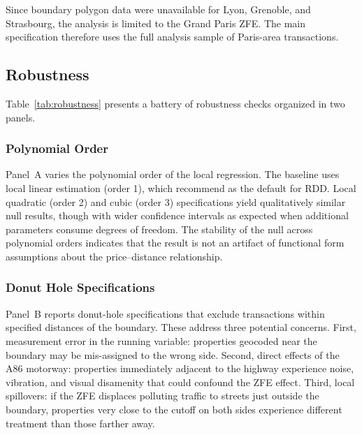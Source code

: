 \documentclass[12pt]{article}
\begin{document}
Since boundary polygon data were unavailable for Lyon, Grenoble, and Strasbourg, the analysis is limited to the Grand Paris ZFE. The main specification therefore uses the full analysis sample of Paris-area transactions.

\subsection{Robustness}



Table~\ref{tab:robustness} presents a battery of robustness checks organized in two panels.

\subsubsection{Polynomial Order}

Panel~A varies the polynomial order of the local regression. The baseline uses local linear estimation (order 1), which \citet{gelman2019high} recommend as the default for RDD. Local quadratic (order 2) and cubic (order 3) specifications yield qualitatively similar null results, though with wider confidence intervals as expected when additional parameters consume degrees of freedom. The stability of the null across polynomial orders indicates that the result is not an artifact of functional form assumptions about the price--distance relationship.

\subsubsection{Donut Hole Specifications}

Panel~B reports donut-hole specifications that exclude transactions within specified distances of the boundary. These address three potential concerns. First, measurement error in the running variable: properties geocoded near the boundary may be mis-assigned to the wrong side. Second, direct effects of the A86 motorway: properties immediately adjacent to the highway experience noise, vibration, and visual disamenity that could confound the ZFE effect. Third, local spillovers: if the ZFE displaces polluting traffic to streets just outside the boundary, properties very close to the cutoff on both sides experience different treatment than those farther away.
\end{document}
